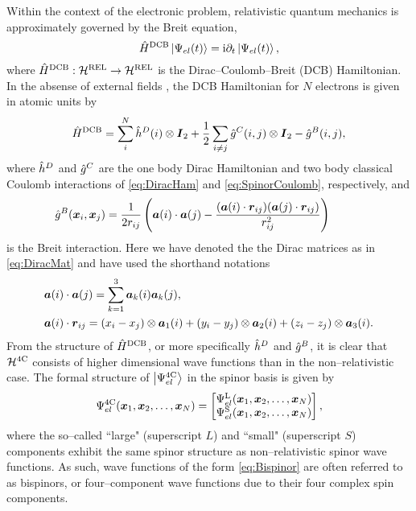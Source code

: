 Within the context of the electronic problem, relativistic quantum mechanics is approximately governed
by the Breit equation,
\begin{equation}
\label{eq:BreitEq}
\hat{H}^{\mathrm{DCB}} \left\vert \Psi_{el} (t) \right\rangle = \mathrm i \partial_t \left\vert \Psi_{el} (t) \right\rangle,
\end{equation}
where $\hat{H}^{\mathrm{DCB}} : \mathcal{H}^{\mathrm{REL}} \rightarrow \mathcal{H}^{\mathrm{REL}}$ is the Dirac--Coulomb--Breit (DCB) Hamiltonian.
In the absense of external fields , the DCB Hamiltonian for $N$ electrons is given in atomic units by 
\begin{equation}
  \label{eq:DCBHam}
  \hat{H}^{\mathrm{DCB}} = \sum_i^N  \hat{h}^D(i) \otimes \boldsymbol{I}_2 + \frac{1}{2} \sum_{i \neq j}\hat{g}^C(i,j) \otimes \boldsymbol{I}_2 
  - \hat{g}^B(i,j),
\end{equation}
where $\hat{h}^D$ and $\hat{g}^C$ are the one body Dirac Hamiltonian and two body classical Coulomb interactions of \cref{eq:DiracHam} and 
\cref{eq:SpinorCoulomb}, respectively, and
\begin{align}
  &\hat{g}^B(\boldsymbol{x}_i,\boldsymbol{x}_j) = \frac{1}{2r_{ij}} \left( \boldsymbol{a}(i)\cdot\boldsymbol{a}(j) - \frac{(\boldsymbol{a}(i) \cdot \boldsymbol{r}_{ij}) (\boldsymbol{a}(j) \cdot \boldsymbol{r}_{ij})}{r_{ij}^2}\right) 
\qquad  \label{eq:BreitInt}
\end{align}
is the Breit interaction. Here we have denoted the the Dirac matrices as in \cref{eq:DiracMat}
and have used the shorthand notations
\begin{align}
  &\boldsymbol{a}(i) \cdot \boldsymbol{a}(j) = \sum_{k = 1}^3 \boldsymbol{a}_k(i) \boldsymbol{a}_k(j), \\
  &\boldsymbol{a}(i) \cdot \boldsymbol{r}_{ij} = (x_i - x_j) \otimes \boldsymbol{a}_1(i) + (y_i - y_j) \otimes \boldsymbol{a}_2(i) + (z_i - z_j) \otimes \boldsymbol{a}_3(i).
\end{align}
From the structure of $\hat{H}^{\mathrm{DCB}}$, or more specifically  $\hat{h}^D$ and $\hat{g}^B$, it is clear that $\mathcal{H}^{\mathrm{4C}}$
consists of higher dimensional wave functions than in the non--relativistic case. 
The formal structure of $\left\vert \Psi_{el}^{\mathrm{4C}} \right\rangle$ in the spinor basis is given by 
\begin{equation}
  \label{eq:Bispinor}
  \Psi_{el}^{\mathrm{4C}}(\boldsymbol{x}_1,\boldsymbol{x}_2,\ldots,\boldsymbol{x}_N) = 
    \begin{bmatrix}
       \Psi_{el}^\mathrm{L}(\boldsymbol{x}_1,\boldsymbol{x}_2,\ldots,\boldsymbol{x}_N) \\
       \Psi_{el}^\mathrm{S}(\boldsymbol{x}_1,\boldsymbol{x}_2,\ldots,\boldsymbol{x}_N) 
    \end{bmatrix},
\end{equation}
where the so--called ``large" (superscript $L$) and ``small" (superscript $S$) components exhibit the same spinor
structure as non--relativistic spinor wave functions. As such, wave functions of the form \cref{eq:Bispinor} are often
referred to as bispinors, or four--component wave functions due to their four complex spin components.



